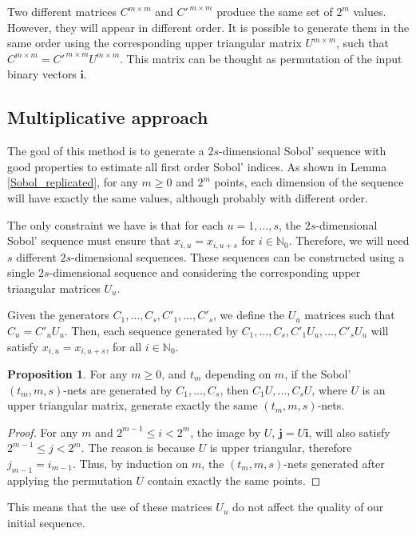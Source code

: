 \documentclass[]{elsarticle}
\theoremstyle{definition}
\newtheorem{prop}{Proposition}
\newcommand{\bvec}[1]{\boldsymbol{#1}}
\newcommand{\vi}{\bvec{i}}
\newcommand{\vj}{\bvec{j}}
\begin{document}
Two different matrices $C^{m\times m}$ and $C'^{\,m\times m}$ produce the same set of $2^m$ values. However, they will appear in different order. It is possible to generate them in the same order using the corresponding upper triangular matrix $U^{m\times m}$, such that $C^{m\times m}=C'^{\,m\times m}U^{m\times m}$. This matrix can be thought as permutation of the input binary vectors $\vi$.

\subsection{Multiplicative approach}

The goal of this method is to generate a $2s$-dimensional Sobol' sequence with good properties to estimate all first order Sobol' indices. As shown in Lemma \ref{Sobol_replicated}, for any $m\geq 0$ and $2^m$ points, each dimension of the sequence will have exactly the same values, although probably with different order.

The only constraint we have is that for each $u=1,\dots,s$, the $2s$-dimensional Sobol' sequence must ensure that $x_{i,u}=x_{i,u+s}$ for $i\in\mathbb{N}_0$. Therefore, we will need $s$ different $2s$-dimensional sequences. These sequences can be constructed using a single $2s$-dimensional sequence and considering the corresponding upper triangular matrices $U_u$.

Given the generators $C_1,\dots,C_s,C'_1,\dots,C'_s$, we  define the $U_u$ matrices such that $C_u=C'_uU_u$. Then, each sequence generated by $C_1,\dots,C_s,C'_1U_u,\dots,C'_sU_u$ will satisfy $x_{i,u}=x_{i,u+s}$, for all $i\in\mathbb{N}_0$.

\begin{prop}
For any $m\geq 0$, and $t_m$ depending on $m$, if the Sobol' $(t_m,m,s)$-nets are generated by $C_1,\dots,C_s$, then $C_1U,\dots,C_sU$, where $U$ is an upper triangular matrix, generate exactly the same $(t_m,m,s)$-nets.
\end{prop}
\begin{proof}
For any $m$ and $2^{m-1}\leq i < 2^m$, the image by $U$, $\vj=U\vi$, will also satisfy $2^{m-1}\leq j < 2^m$. The reason is because $U$ is upper triangular, therefore $j_{m-1}=i_{m-1}$. Thus, by induction on $m$, the $(t_m,m,s)$-nets generated after applying the permutation $U$ contain exactly the same points.
\end{proof}

This means that the use of these matrices $U_u$ do not affect the quality of our initial sequence.
\end{document}
